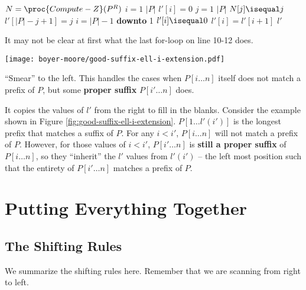 \begin{codebox}
    \li $N = \proc{Compute-Z}(P^R)$
    \li {}
    \li \For $i = 1$ \To $|P|$ \Do
        \li $l'[i] = 0$
    \End
    \li {}
    \li \For $j = 1$ \To $|P|$ \Do
        \li \If $N[j] \isequal j$ \Then
            \li $l'[|P|-j+1] = j$
        \End
    \End
    \li {}
    \li \For $i = |P|-1$ \textbf{downto} 1 \Do
        \li \If $l'[i] \isequal 0$ \Then
            \li $l'[i] = l'[i+1]$
        \End
    \End
    \li \Return $l'$ 
\end{codebox}

It may not be clear at first what the last for-loop on line 10-12 does. 
\begin{marginfigure}
    \texttt{[image: boyer-moore/good-suffix-ell-i-extension.pdf]}
    \caption{``Smear'' to the left. This handles the cases when $P[i\ldots n]$ itself does not match a prefix of $P$, but some \textbf{proper suffix} $P[i' \ldots n]$ does.}
    \label{fig:good-suffix-ell-i-extension}
\end{marginfigure}
It copies the values of $l'$ from the right to fill in the blanks. Consider the example shown in Figure \ref{fig:good-suffix-ell-i-extension}. $P[1\ldots l'(i')]$ is the longest prefix that matches a suffix of $P$. For any $i < i'$, $P[i \ldots n]$ will not match a prefix of $P$. However, for those values of $i < i'$, $P[i'\ldots n]$ is \textbf{still a proper suffix} of $P[i \ldots n]$, so they ``inherit'' the $l'$ values from $l'(i')$ -- the left most position such that the entirety of $P[i'\ldots n]$ matches a prefix of $P$.

\section{Putting Everything Together}

\subsection{The Shifting Rules}

We summarize the shifting rules here. Remember that we are scanning from right to left.

